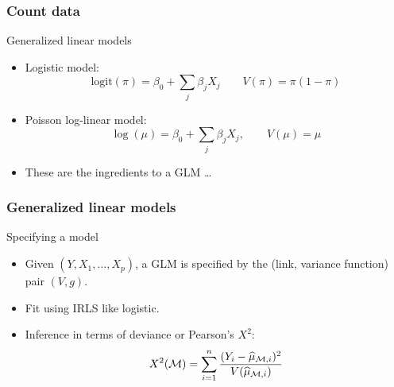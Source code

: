 \documentclass[handout]{beamer}
\newcommand{\logit}{\text{logit}}
\begin{document}
   \begin{frame} \frametitle{Count data}

   \begin{block}
         {Generalized linear models}
         \begin{itemize}
         \item Logistic model:
   $$ \logit(\pi) = \beta_0 + \sum_j \beta_j X_j \qquad V(\pi)=\pi(1-\pi)$$

   \item Poisson log-linear model:
   $$
   \log(\mu) = \beta_0 + \sum_j \beta_j X_j, \qquad V(\mu) = \mu$$

   \item These are the ingredients to a GLM \dots
         \end{itemize}
   \end{block}
   \end{frame}


   \begin{frame} \frametitle{Generalized linear models}

   \begin{block}
         {Specifying a model}
         \begin{itemize}
         \item Given $(Y, X_1, \dots, X_p)$, a GLM is specified by the
   (link, variance function) pair $(V, g)$.

   \item Fit using IRLS like logistic.

   \item Inference in terms of deviance or Pearson's $X^2$:
   $$
   X^2({\cal M}) = \sum_{i=1}^n \frac{(Y_i - \widehat{\mu}_{{\cal M},i})^2}{V(\widehat{\mu}_{{\cal M},i})}$$
         \end{itemize}
   \end{block}
   \end{frame}

\end{document}

